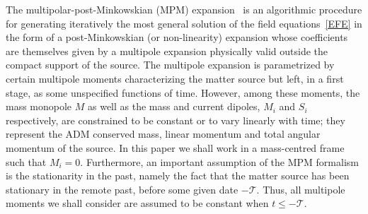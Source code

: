 \documentclass[prd,preprint,superscriptaddress,tightenlines,nofootinbib,
  eqsecnum,showpacs]{revtex4}
\begin{document}
The multipolar-post-Minkowskian (MPM) expansion~\cite{BD86} is an
algorithmic procedure for generating iteratively the most general
solution of the field equations~\eqref{EFE} in the form of a
post-Minkowskian (or non-linearity) expansion whose coefficients are
themselves given by a multipole expansion physically valid outside the
compact support of the source. The multipole expansion is parametrized
by certain multipole moments characterizing the matter source but
left, in a first stage, as some unspecified functions of
time. However, among these moments, the mass monopole $M$ as well as
the mass and current dipoles, $M_i$ and $S_i$ respectively, are
constrained to be constant or to vary linearly with time; they
represent the ADM conserved mass, linear momentum and total angular
momentum of the source. In this paper we shall work in a mass-centred
frame such that $M_i=0$. Furthermore, an important assumption of the
MPM formalism is the stationarity in the past, namely the fact that
the matter source has been stationary in the remote past, before some
given date $-\mathcal{T}$. Thus, all multipole moments we shall
consider are assumed to be constant when $t\leqslant -\mathcal{T}$.
\end{document}
